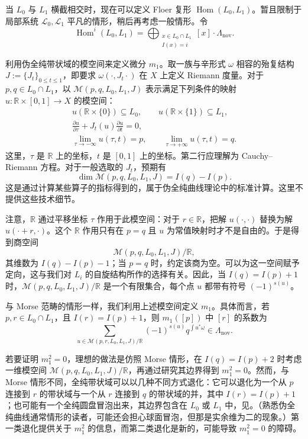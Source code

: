 当 $L_0$ 与 $L_1$ 横截相交时，现在可以定义 Floer 复形 $\operatorname{Hom}(L_0,L_1)$。暂且限制于局部系统 $\mathcal L_0,\mathcal L_1$ 平凡的情形，稍后再考虑一般情形。令
\[
\operatorname{Hom}^i(L_0,L_1)=
\bigoplus_{\substack{x\in L_0\cap L_1\\I(x)=i}}[x]\cdot\Lambda_{\mathrm{nov}}.
\]

利用伪全纯带状域的模空间来定义微分 $m_1$。取一族与辛形式 $\omega$ 相容的殆复结构 $J:=\{J_t\}_{0\leq t\leq1}$，即要求 $\omega(\cdot,J_t\cdot)$ 在 $X$ 上定义 Riemann 度量。对于 $p,q\in L_0\cap L_1$，以 $\mathcal M(p,q,L_0,L_1,J)$ 表示满足下列条件的映射 $u\colon\mathbb R\times[0,1]\to X$ 的模空间：
\[
\begin{gathered}
u(\mathbb R\times\{0\})\subseteq L_0,\qquad
u(\mathbb R\times\{1\})\subseteq L_1,\\
\frac{\partial u}{\partial\tau}+J_t(u)\frac{\partial u}{\partial t}=0,\\
\lim_{\tau\to-\infty}u(\tau,t)=p,\qquad
\lim_{\tau\to+\infty}u(\tau,t)=q.
\end{gathered}
\]
这里，$\tau$ 是 $\mathbb R$ 上的坐标，$t$ 是 $[0,1]$ 上的坐标。第二行应理解为 Cauchy--Riemann 方程。对于一般选取的 $J_t$，预期有
\[
\dim\mathcal M(p,q,L_0,L_1,J)=I(q)-I(p).
\]
这是通过计算某些算子的指标得到的，属于伪全纯曲线理论中的标准计算。这里不提供这些技术细节。

注意，$\mathbb R$ 通过平移坐标 $\tau$ 作用于此模空间：对于 $r\in\mathbb R$，把解 $u(\cdot,\cdot)$ 替换为解 $u(\cdot+r,\cdot)$。这个 $\mathbb R$ 作用只有在 $p=q$ 且 $u$ 为常值映射时才不是自由的。于是得到商空间
\[
\mathcal M(p,q,L_0,L_1,J)/\mathbb R,
\]
其维数为 $I(q)-I(p)-1$；当 $p=q$ 时，约定该商为空。可以为这一空间赋予定向，这与我们对 $L_i$ 的自旋结构所作的选择有关。因此，当 $I(q)=I(p)+1$ 时，$\mathcal M(p,q,L_0,L_1,J)/\mathbb R$ 是一个有限集合，每个点 $u$ 都带有符号 $(-1)^{s(u)}$。

与 Morse 范畴的情形一样，我们利用上述模空间定义 $m_1$。具体而言，若 $p,r\in L_0\cap L_1$，且 $I(r)=I(p)+1$，则 $m_1([p])$ 中 $[r]$ 的系数为
\[
\sum_{u\in\mathcal M(p,r,L_0,L_1,J)/\mathbb R}
(-1)^{s(u)}q^{\int u^*\omega}\in\Lambda_{\mathrm{nov}}.
\]

若要证明 $m_1^2=0$，理想的做法是仿照 Morse 情形，在 $I(q)=I(p)+2$ 时考虑一维模空间 $\mathcal M(p,q,L_0,L_1,J)/\mathbb R$，再通过研究其边界得到 $m_1^2=0$。然而，与 Morse 情形不同，全纯带状域可以以几种不同方式退化：它可以退化为一个从 $p$ 连接到 $r$ 的带状域与一个从 $r$ 连接到 $q$ 的带状域的并，其中 $I(r)=I(p)+1$；也可能有一个全纯圆盘冒泡出来，其边界包含在 $L_0$ 或 $L_1$ 中，见。（熟悉伪全纯曲线通常情形的读者，可能还会担心球面冒泡，但那是实余维为二的现象。）第一类退化提供关于 $m_1^2$ 的信息，而第二类退化是新的，可能导致 $m_1^2=0$ 的障碍。

